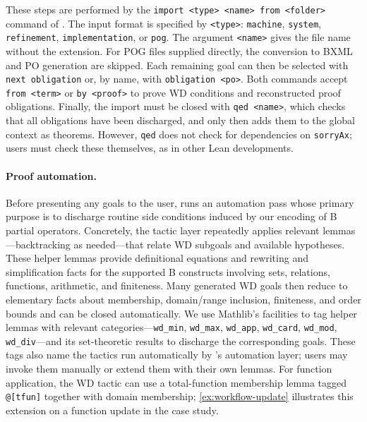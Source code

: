 These steps are performed by the \texttt{import <type> <name> from <folder>} command of \barrel.
The input format is specified by \texttt{<type>}: \texttt{machine}, \texttt{system}, \texttt{refinement}, \texttt{implementation}, or \texttt{pog}.
The argument \texttt{<name>} gives the file name without the extension.
For POG files supplied directly, the conversion to BXML and PO generation are skipped.
Each remaining goal can then be selected with \texttt{next obligation} or, by name, with \texttt{obligation <po>}.
Both commands accept \texttt{from <term>} or \texttt{by <proof>} to prove WD conditions and reconstructed proof obligations.
Finally, the import must be closed with \texttt{qed <name>}, which checks that all obligations have been discharged, and only then adds them to the global context as theorems.
However, \texttt{qed} does not check for dependencies on \texttt{sorryAx}; users must check these themselves, as in other Lean developments.




\paragraph*{Proof automation.}
\label{par:automation}
Before presenting any goals to the user, \barrel runs an automation pass whose primary purpose is to discharge routine side conditions induced by our encoding of B partial operators.
Concretely, the tactic layer repeatedly applies relevant lemmas---backtracking as needed---that relate WD subgoals and available hypotheses.
These helper lemmas provide definitional equations and rewriting and simplification facts for the supported B constructs involving sets, relations, functions, arithmetic, and finiteness. Many generated WD goals then reduce to elementary facts about membership, domain/range inclusion, finiteness, and order bounds and can be closed automatically.
We use Mathlib's facilities to tag helper lemmas with relevant categories---\texttt{wd\_min}, \texttt{wd\_max}, \texttt{wd\_app}, \texttt{wd\_card}, \texttt{wd\_mod}, \texttt{wd\_div}---and its set-theoretic results to discharge the corresponding goals.
These tags also name the tactics run automatically by \barrel's automation layer; users may invoke them manually or extend them with their own lemmas.
For function application, the WD tactic can use a total-function membership lemma tagged \texttt{@[tfun]} together with domain membership; \cref{ex:workflow-update} illustrates this extension on a function update in the case study.




